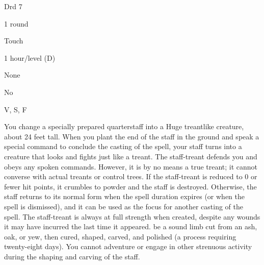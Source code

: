 
\begin{description*}
\item[Level:] Drd 7
\item[Casting Time:] 1 round
\item[Range:] Touch
\item[Duration:] 1 hour/level (D)
\item[Saving Throw:] None
\item[Spell Resistance:] No
\item[Components:] V, S, F
\end{description*}

You change a specially prepared quarterstaff into a Huge treantlike creature, about
24 feet tall. When you plant the end of the staff in the ground and speak a special
command to conclude the casting of the spell, your staff turns into a creature
that looks and fights just like a treant. The staff-treant defends you and obeys
any spoken commands. However, it is by no means a true treant; it cannot converse
with actual treants or control trees. If the staff-treant is reduced to 0 or fewer
hit points, it crumbles to powder and the staff is destroyed. Otherwise, the staff
returns to its normal form when the spell duration expires (or when the spell is
dismissed), and it can be used as the focus for another casting of the spell. The
staff-treant is always at full strength when created, despite any wounds it may
have incurred the last time it appeared.
be a sound limb cut from an ash, oak, or yew, then cured, shaped, carved, and polished
(a process requiring twenty-eight days).
You cannot adventure or engage in other strenuous activity during the shaping and
carving of the staff.